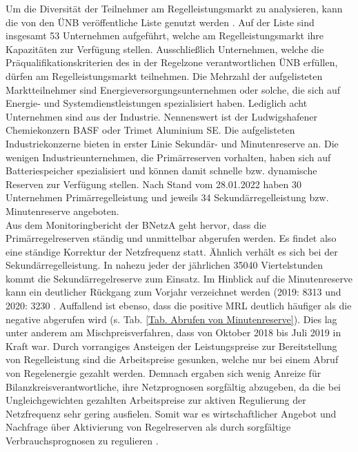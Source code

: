 			Um die Diversität der Teilnehmer am Regelleistungsmarkt zu analysieren, kann die von den ÜNB veröffentliche Liste genutzt werden \cite{regelleistungnet_PRL_Ausschreibung}.
			Auf der Liste sind insgesamt \num{53} Unternehmen aufgeführt, welche am Regelleistungsmarkt ihre Kapazitäten zur Verfügung stellen.
			Ausschließlich Unternehmen, welche die Präqualifikationskriterien des in der Regelzone verantwortlichen ÜNB erfüllen, dürfen am Regelleistungsmarkt teilnehmen.
			Die Mehrzahl der aufgelisteten Marktteilnehmer sind Energieversorgungsunternehmen oder solche, die sich auf Energie- und Systemdienstleistungen spezialisiert haben.
			Lediglich acht Unternehmen sind aus der Industrie.
			Nennenswert ist der Ludwigshafener Chemiekonzern BASF oder Trimet Aluminium SE.
			Die aufgelisteten Industriekonzerne bieten in erster Linie Sekundär- und Minutenreserve an.
			Die wenigen Industrieunternehmen, die Primärreserven vorhalten, haben sich auf Batteriespeicher spezialisiert und können damit schnelle bzw. dynamische Reserven zur Verfügung stellen.
			Nach Stand vom 28.01.2022 haben 30 Unternehmen Primärregelleistung und jeweils 34 Sekundärregelleistung bzw. Minutenreserve angeboten. \\
			
			Aus dem Monitoringbericht der BNetzA geht hervor, dass die Primärregelreserven ständig und unmittelbar abgerufen werden. 
			Es findet also eine ständige Korrektur der Netzfrequenz statt.
			Ähnlich verhält es sich bei der Sekundärregelleistung. 
			In nahezu jeder der jährlichen \num{35040} Viertelstunden kommt die Sekundärregelreserve zum Einsatz.
			Im Hinblick auf die Minutenreserve kann ein deutlicher Rückgang zum Vorjahr verzeichnet werden (2019: 8313 und 2020: 3230 \cite{Monitoringbericht_BNetzA}.
			Auffallend ist ebenso, dass die positive MRL deutlich häufiger als die negative abgerufen wird (s. Tab. \ref{Tab. Abrufen von Minutenreserve}).
			Dies lag unter anderem am Mischpreisverfahren, dass von Oktober 2018 bis Juli 2019 in Kraft war.
			Durch vorrangiges Ansteigen der Leistungspreise zur Bereitstellung von Regelleistung sind die Arbeitspreise gesunken, welche nur bei einem Abruf von Regelenergie gezahlt werden.
			Demnach ergaben sich wenig Anreize für Bilanzkreisverantwortliche, ihre Netzprognosen sorgfältig abzugeben, da die bei Ungleichgewichten gezahlten Arbeitspreise zur aktiven Regulierung der Netzfrequenz sehr gering ausfielen.
			Somit war es wirtschaftlicher Angebot und Nachfrage über Aktivierung von Regelreserven als durch sorgfältige Verbrauchsprognosen zu regulieren \cite{Monitoringbericht_BNetzA}.
						
